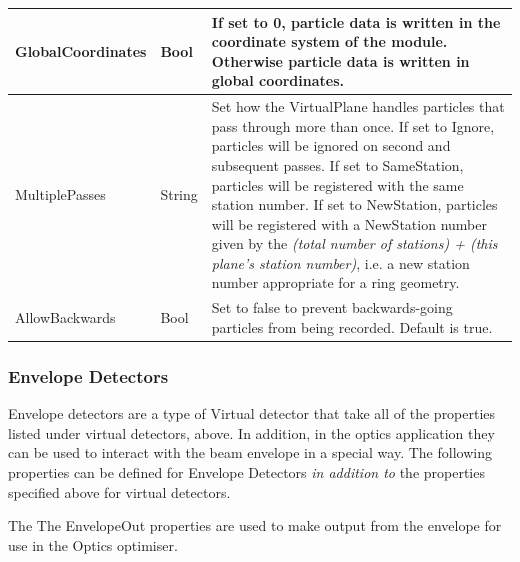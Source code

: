 \begin{center}
\begin{supertabular}{|m{3.665cm}|m{1.3579999cm}|m{11.973001cm}|}
GlobalCoordinates &
Bool &
If set to 0, particle data is written in the coordinate system of the module. Otherwise particle data is written in
global coordinates.\\\hline
MultiplePasses &
String &
Set how the VirtualPlane handles particles that pass through more than once. If set to Ignore, particles will be ignored
on second and subsequent passes. If set to SameStation, particles will be registered with the same station number. If
set to NewStation, particles will be registered with a NewStation number given by the \textit{(total number of
stations) + (this plane's station number)}, i.e. a new station number appropriate for a ring geometry.\\\hline
AllowBackwards &
Bool &
Set to false to prevent backwards-going particles from being recorded. Default is true.\\\hline
\end{supertabular}
\end{center}

\subsubsection{Envelope Detectors}
Envelope detectors are a type of Virtual detector that take all of the properties listed under virtual detectors, above.
In addition, in the optics application they can be used to interact with the beam envelope in a special way. The
following properties can be defined for Envelope Detectors \textit{in addition to} the properties specified above for
virtual detectors.

The The EnvelopeOut properties are used to make output from the envelope for use in the Optics optimiser.


